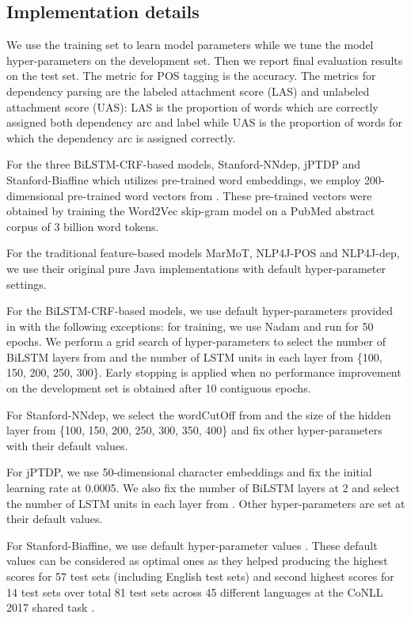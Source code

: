 \documentclass[twocolumn,hyperref]{bmcart}\pdfoutput=1
\begin{document}
\subsection*{Implementation details}

We use the training set  to learn model parameters while we tune the model hyper-parameters on the development set. Then we report final evaluation results on the test set. The metric for POS tagging is the accuracy. The metrics for dependency parsing are the labeled attachment score (LAS) and unlabeled attachment score (UAS): LAS is the proportion of words which are correctly
assigned both dependency arc and label
while UAS is the proportion of words for which
the dependency arc is assigned correctly.

For  the three BiLSTM-CRF-based models, Stanford-NNdep, jPTDP and Stanford-Biaffine which utilizes pre-trained word embeddings,  we employ 200-dimensional pre-trained word vectors from \cite{chiu-EtAl:2016:BioNLP16}. 
These pre-trained vectors were obtained by training the Word2Vec skip-gram model \cite{Mikolov:2013} on a PubMed abstract corpus of 3 billion word tokens.

For the traditional feature-based models MarMoT, NLP4J-POS and NLP4J-dep, we use their original pure Java implementations with default hyper-parameter settings. 

For the BiLSTM-CRF-based models, we use default hyper-parameters provided in \cite{reimers-gurevych:2017:EMNLP2017}  with the following exceptions: for training, we use Nadam \cite{Dozat2015IncorporatingNM} and run for 50 epochs. We perform a grid search of hyper-parameters  to select the number of BiLSTM layers from  and the number of LSTM units in each layer from \{100, 150, 200, 250, 300\}.  Early stopping is applied when no performance improvement on the development set is obtained after 10 contiguous epochs. 



For Stanford-NNdep, we select the  \textsf{\small{wordCutOff}}  from  and  the size of the hidden layer  from \{100, 150, 200, 250, 300, 350, 400\} and fix other hyper-parameters  with their default values. 
 
 For jPTDP, we use 50-dimensional character embeddings and fix the initial learning rate at 0.0005. We also fix the number of BiLSTM layers  at 2 and select the number of LSTM units in each layer from . Other hyper-parameters  are set at their default values. 

For Stanford-Biaffine, we use default hyper-parameter values  \cite{dozat-qi-manning:2017:K17-3}. These default values can be considered as optimal ones as they helped producing the highest scores for 57 test sets (including English test sets) and second highest scores for  14 test sets over total 81 test sets across 45 different languages at the CoNLL 2017 shared task  \cite{zeman-EtAl:2017:K17-3}. 
\end{document}
